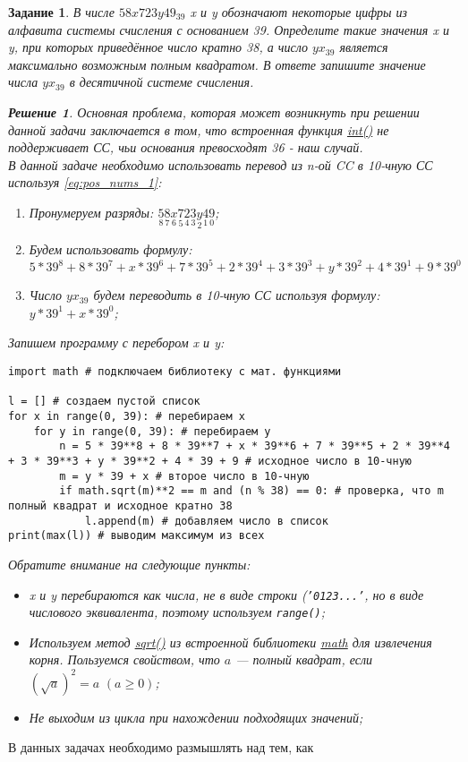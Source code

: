 \documentclass[12pt]{article}
\theoremstyle{problem_style}
\newtheorem{problem}{Задание}[subsection]
\newtheorem{solution}{Решение}[subsection]
\begin{document}
\begin{problem}
В числе $58x723y49_{39}$ x и y обозначают некоторые цифры из алфавита системы счисления с основанием 39. Определите такие значения x и y, при которых приведённое число кратно 38, а число $yx_{39}$ является максимально возможным полным квадратом. В ответе запишите значение числа $yx_{39}$ в десятичной системе счисления.
\begin{solution}
Основная проблема, которая может возникнуть при решении данной задачи заключается в том, что встроенная функция \href{https://docs.python.org/3/library/functions.html#int}{int()} не поддерживает СС, чьи основания превосходят 36 - наш случай.\\
В данной задаче необходимо использовать перевод из n-ой CC в 10-чную СС используя \autoref{eq:pos_nums_1}:
\begin{enumerate}
    \item Пронумеруем разряды: $\underset{8}{5} \underset{7}{8} \underset{6}{x} \underset{5}{7} \underset{4}{2} \underset{3}{3} \underset{2}{y} \underset{1}{4} \underset{0}{9}$;
    \item Будем использовать формулу:
    \[5 * 39^8 + 8 * 39^7 + x * 39^6 + 7 * 39^5 + 2 * 39^4 + 3 * 39^3 + y * 39^2 + 4 * 39^1 + 9 * 39^0\]
    \item Число $yx_{39}$ будем переводить в 10-чную СС используя формулу: $y * 39^1 + x * 39^0$;
\end{enumerate}
Запишем программу с перебором x и y:
\begin{verbatim}
import math # подключаем библиотеку с мат. функциями

l = [] # создаем пустой список
for x in range(0, 39): # перебираем x
    for y in range(0, 39): # перебираем y
        n = 5 * 39**8 + 8 * 39**7 + x * 39**6 + 7 * 39**5 + 2 * 39**4 + 3 * 39**3 + y * 39**2 + 4 * 39 + 9 # исходное число в 10-чную
        m = y * 39 + x # второе число в 10-чную
        if math.sqrt(m)**2 == m and (n % 38) == 0: # проверка, что m полный квадрат и исходное кратно 38
            l.append(m) # добавляем число в список
print(max(l)) # выводим максимум из всех
\end{verbatim}
Обратите внимание на следующие пункты:
\begin{itemize}
    \item x и y перебираются как числа, не в виде строки (\texttt{'0123...'}, но в виде числового эквивалента, поэтому используем \texttt{range()};
    \item Используем метод \href{https://docs.python.org/3/library/math.html#math.sqrt}{sqrt()} из встроенной библиотеки \href{https://docs.python.org/3/library/math.html}{math} для извлечения корня. Пользуемся свойством, что $a$ — полный квадрат, если $(\sqrt{a})^2 = a\,\,(a \geqslant 0)$;
    \item Не выходим из цикла при нахождении подходящих значений;
\end{itemize}
\end{solution}
\end{problem}
В данных задачах необходимо размышлять над тем, как 
\end{document}
